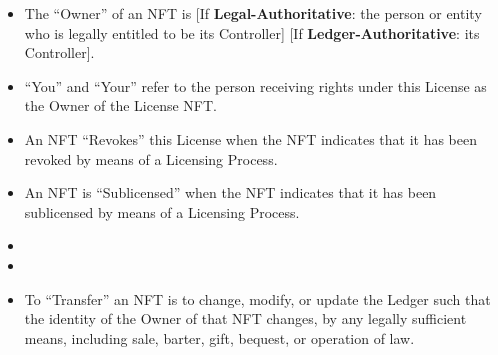 \documentclass{article}
\newcommand{\keyword}[1]{\textbf{#1}\xspace}
\newcommand{\sharealike}{\keyword{Share-Alike}}
\newcommand{\derivativetracking}{\keyword{Derivative-Tracking}}
\newcommand{\ledger}{\keyword{Ledger-Authoritative}}
\newcommand{\legal}{\keyword{Legal-Authoritative}}
\newcommand{\subsect}[1]{\vspace{12pt}\noindent{\em{#1}}}
\newcommand{\iflicenseoption}[2]{[\colorbox{light-gray}{If #1:} #2]}
\begin{document}
\begin{sffamily}
	\subsect{Ownership and Transfers}

	\begin{itemize}
	
	\item	 The ``Owner'' of an NFT is \iflicenseoption{\legal}{the person or entity who is legally entitled to be its Controller} \iflicenseoption{\ledger}{its Controller}.
		
	\item	``You'' and ``Your'' refer to the person receiving rights under this License as the Owner of the License NFT.

	\item	An NFT ``Revokes'' this License when the NFT indicates that it has been revoked by means of a Licensing Process.

	\item	An NFT is ``Sublicensed'' when the NFT indicates that it has been sublicensed by means of a Licensing Process.

	\item 	\iflicenseoption{\derivativetracking}{Adapted Material is ``Derivative Tracked'' from an NFT (the ``Parent NFT'') when the Parent NFT is Sublicensed by means of a Licensing Process that (1) creates another NFT (the ``Child NFT'') by means of the same NFT Generator that created the Parent NFT, (2) causes the Child NFT to be Linked to Adapted Material, and (3) causes the Child NFT and Parent NFT to have materially the same properties and functionality, except for the identity of the parties they are Associated with and the identity of the material they are Linked to.}

	\item 	\iflicenseoption{\sharealike}{Adapted Material is ``Share-Alike Sublicensed'' from an NFT (the ``Parent NFT'') when the Parent NFT is Sublicensed by means of a Licensing Process that (1) creates another NFT (the ``Child NFT'') by means of the same NFT Generator that created the Parent NFT, (2) causes the Child NFT to be Linked to Adapted Material, (3) causes the Child NFT and Parent NFT to have materially the same properties and functionality, except for the identity of the parties they are Associated with and the identity of the material they are Linked to, and (4)causes the Child NFT to Invoke this license.}

	\item	To ``Transfer'' an NFT is to change, modify, or update the Ledger such that the identity of the Owner of that NFT changes, by any legally sufficient means, including sale, barter, gift, bequest, or operation of law. 
		

\end{itemize}
\end{sffamily}
\end{document}
